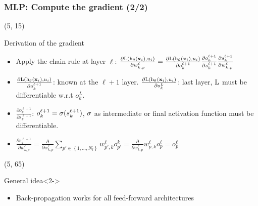 \begin{frame}
  \frametitle{\acl{MLP}: Compute the gradient (2/2)}

  \begin{textblock}{90}(5, 15)
    \begin{block}{Derivation of the gradient}
      \begin{itemize}
      \item Apply the chain rule at layer $\ell$:
        $
        \frac{\partial \mathrm{L} \left ( {\mathrm{h}_{\mathbf{\theta}} \left ( {\mathbf{x}_i} \right ), u_i} \right ) }{\partial w_{k,p}^\ell} =
        \frac{\partial \mathrm{L} \left ( {\mathrm{h}_{\mathbf{\theta}} \left ( {\mathbf{x}_i} \right ), u_i} \right )}{\partial o_k^{\ell+1}} \frac{\partial o_k^{\ell+1}}{\partial s_k^{\ell+1}} \frac{\partial s_k^{\ell+1}}{\partial w_{k,p}^{\ell}}
        $

      \item $\frac{\partial \mathrm{L} \left ( {\mathrm{h}_{\mathbf{\theta}} \left ( {\mathbf{x}_i} \right ), u_i} \right )}{\partial o_k^{\ell+1}}$: known at the $\ell+1$ layer. $\frac{\partial \mathrm{L} \left ( {\mathrm{h}_{\mathbf{\theta}} \left ( {\mathbf{x}_i} \right ), u_i} \right )}{\partial o_k^{L}}$: last layer, $\mathrm{L}$ must be differentiable w.r.t $o_k^{L}$.


      \item $\frac{\partial o_k^{\ell+1}}{\partial s_k^{\ell+1}}$: $o_k^{\ell+1} = \mathrm{\sigma}(s_k^{\ell+1})$, $\mathrm{\sigma}$ as intermediate or final activation function must be differentiable.

      \item $\frac{\partial s_k^{\ell+1}}{\partial w_{k,p}^{\ell}} = \frac{\partial}{\partial w_{k,p}^{\ell}} \sum_{p' \in \left\{1,\ldots,N_l \right\}}  w_{p', k}^{\ell}o_{p'}^{k}= \frac{\partial }{\partial w_{k,p}^{\ell}}  w_{p, k}^{\ell}o_{p}^{\ell}=o_{p}^{\ell}$

    \end{itemize}
    \end{block}
  \end{textblock}

  \begin{textblock}{90}(5, 65)
    \begin{block}{General idea}<2->
      \begin{itemize}
      \item Back-propagation works for all feed-forward architectures
        \hyperlink{MLP_Learning_2}{}
      \end{itemize}
    \end{block}
  \end{textblock}
\end{frame}
